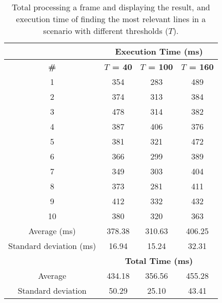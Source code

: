 \begin{table}[h]
	\footnotesize
    \begin{center}
    \begin{tabular}{c c c c}
    \hline 
    & \multicolumn{3}{c}{\textbf{Execution Time (ms)}}\\
    \hline
    \textbf{\#} & \textbf{$T$ = 40} & \textbf{$T$ = 100} & \textbf{$T$ = 160}\\
	\hline    
1&	354&	283&	489\\
2&	374&	313&	384\\
3&	478&	314&	382\\
4&	387&	406&	376\\
5&	381&	321&	472\\
6&	366&	299&	389\\
7&	349&	303&	404\\
8&	373&	281&	411\\
9&	412&	332&	432\\
10&	380&	320&	363\\
	\hline
	Average (ms) &	378.38 & 310.63 & 406.25\\
	Standard deviation (ms) & 16.94 & 15.24 & 32.31\\
	\hline
	&\multicolumn{3}{c}{\textbf{Total Time (ms)}}\\
    \hline
	Average&	434.18&	356.56&	455.28\\
	Standard deviation&	50.29&	25.10&	43.41\\
    \hline
    \end{tabular}
	\end{center}
    \caption{Total processing a frame and displaying the result, and execution time of finding the most relevant lines in a scenario with different thresholds ($T$).}
    \label{tab:major_lines}
\end{table}


